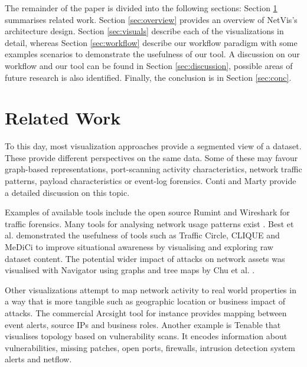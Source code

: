 The remainder of the paper is divided into the following sections: Section \ref{sec:relatedwork}
summarises related work. Section \ref{sec:overview} provides an overview of NetVis's architecture
design. Section \ref{sec:visuals} describe each of the visualizations in detail, whereas Section
\ref{sec:workflow} describe our workflow paradigm with some examples scenarios to demonstrate the
usefulness of our tool. A discussion on our workflow and our tool can be found in Section
\ref{sec:discussion}, possible areas of future research is also identified. Finally, the conclusion
is in Section \ref{sec:conc}.

\section{Related Work} \label{sec:relatedwork}
%
To this day, most visualization approaches provide a segmented view of a dataset. These 
provide different perspectives on the same data. Some of these may favour graph-based 
representations, port-scanning activity characteristics, network traffic patterns, payload 
characteristics or event-log forensics. Conti \cite{Conti} and Marty \cite{marty2009applied} 
provide a detailed discussion on this topic.

Examples of available tools include the open source Rumint \cite{rumint} and Wireshark
\cite{wireshark} for traffic forensics. Many tools for analysing network usage patterns
exist \cite{RADAR, plonka2000flowscan, lau2004spinning, best2010, liao2010}. Best et al.
\cite{best2010} demonstrated the usefulness of tools such as Traffic Circle, CLIQUE and MeDiCi to
improve situational awareness by visualising and exploring raw dataset content. The potential wider
impact of attacks on network assets was visualised with Navigator using graphs and tree maps by Chu
et al. \cite{chu2010}. 

Other visualizations attempt to map network activity to real world properties in a way that is
more tangible such as geographic location or business impact of attacks. The commercial Arcsight
tool \cite{arcsight} for instance provides mapping between event alerts, source IPs and business
roles. Another example is Tenable \cite{Tenable} that visualises topology based on vulnerability
scans. It encodes information about vulnerabilities, missing patches, open ports, firewalls,
intrusion detection system alerts and netflow.

